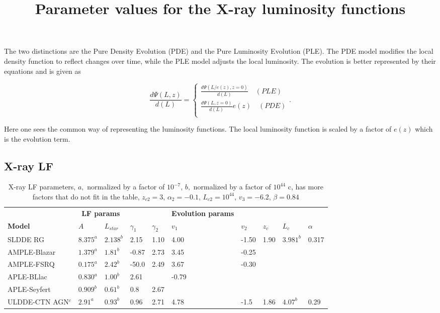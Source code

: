  The two distinctions are the Pure Density Evolution (PDE) and the Pure Luminosity Evolution (PLE). 
 The PDE model modifies the local density function to reflect changes over time, 
 while the PLE model adjusts the local luminosity. The evolution is better represented by their equations and is given as 

 \begin{equation}\frac{d\Psi(L,z)}{d(L)} = 
    \begin{cases}
        \frac{d\Psi(L/e(z),z=0)}{d(L)} \quad (PLE)\\
        \frac{d\Psi(L,z=0)}{d(L)}e(z) \quad (PDE)\\
    \end{cases}
    .
\end{equation}

Here one sees the common way of representing the luminosity functions. The local luminosity function is scaled by a factor of $e(z)$ which is the evolution term.
\subsection{X-ray LF}

\begin{table}
    \centering
    \title{Parameter values for the X-ray luminosity functions}
    \begin{tabularx}{\textwidth}{|l|XXXX|XXXXX|}
        \hline

        & \multicolumn{2}{c}{\textbf{LF params}} &&&  \textbf{Evolution params} &&&&\\

        \textbf{Model} & $A$ & $L_{star}$ & $\gamma _1$ &  $\gamma _2$  & $v_1$ & $v_2$ & $z_c$ & $L_c$ & $ \alpha$\\
        \hline
        SLDDE RG & $8.375^a$ & $2.138^b$ & 2.15 & 1.10 & 4.00 & -1.50 & 1.90 & $3.981^b$ & 0.317  \\

        AMPLE-Blazar & $1.379^a$ & $1.81^b$ & -0.87 & 2.73 & 3.45 & -0.25 & & &  \\

        AMPLE-FSRQ & $0.175^a$ & $2.42^b$ & -50.0 & 2.49 & 3.67 & -0.30 & & &  \\

        APLE-BLlac & $0.830^a$& $1.00^b$ & 2.61 & &-0.79& & & &  \\
        APLE-Seyfert & $0.909^b$ & $0.61^b$ & 0.8 & 2.67& & & & &  \\
        ULDDE-CTN AGN$^c$ & $2.91^a$ & $0.93^b$ & 0.96 & 2.71& 4.78 &-1.5 &1.86 &$4.07^b$ &0.29  \\
        \hline
    \end{tabularx}
    \caption{X-ray LF parameters, $a,$ normalized by a factor of $10^{-7}$, $b,$ normalized by a factor of $10^{44}$
    c, has more factors that do not fit in the table, $z_{c2} = 3$, $\alpha_2 =-0.1$, $L_{c2} = 10^{44}$, $v_3 = -6.2 $, $\beta=0.84$ }
    \label{tab:xray_lf}
\end{table}

